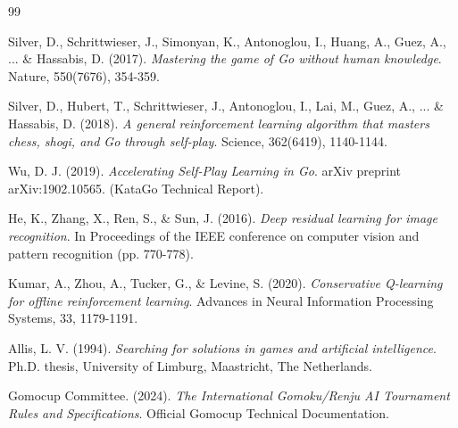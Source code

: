 \documentclass[11pt,a4paper]{report}
\begin{document}
\begin{thebibliography}{99}

Silver, D., Schrittwieser, J., Simonyan, K., Antonoglou, I., Huang, A., Guez, A., ... \& Hassabis, D. (2017). 
\textit{Mastering the game of Go without human knowledge}. 
Nature, 550(7676), 354-359.

Silver, D., Hubert, T., Schrittwieser, J., Antonoglou, I., Lai, M., Guez, A., ... \& Hassabis, D. (2018). 
\textit{A general reinforcement learning algorithm that masters chess, shogi, and Go through self-play}. 
Science, 362(6419), 1140-1144.

Wu, D. J. (2019). 
\textit{Accelerating Self-Play Learning in Go}. 
arXiv preprint arXiv:1902.10565. (KataGo Technical Report).

He, K., Zhang, X., Ren, S., \& Sun, J. (2016). 
\textit{Deep residual learning for image recognition}. 
In Proceedings of the IEEE conference on computer vision and pattern recognition (pp. 770-778).

Kumar, A., Zhou, A., Tucker, G., \& Levine, S. (2020). 
\textit{Conservative Q-learning for offline reinforcement learning}. 
Advances in Neural Information Processing Systems, 33, 1179-1191.

Allis, L. V. (1994). 
\textit{Searching for solutions in games and artificial intelligence}. 
Ph.D. thesis, University of Limburg, Maastricht, The Netherlands.

Gomocup Committee. (2024). 
\textit{The International Gomoku/Renju AI Tournament Rules and Specifications}. 
Official Gomocup Technical Documentation.

\end{thebibliography}
\end{document}
